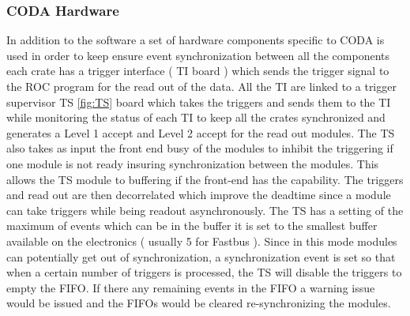 \documentclass{article}
\begin{document}
\subsubsection{CODA Hardware}
In addition to the software a set of hardware components specific to CODA is used in order to keep ensure event synchronization between all the components each crate has a trigger interface ( TI board )\cite{TIman} which sends the trigger signal to the ROC program for the read out of the data. All the TI are linked to a trigger supervisor TS\cite{TSman} \ref{fig:TS} board which takes the triggers and sends them to the TI while monitoring the status of each TI to keep all the crates synchronized and generates a Level 1 accept and Level 2 accept for the read out modules. The TS also takes as input the front end busy of the modules to inhibit the triggering if one module is not ready insuring synchronization between the modules.
This allows the TS module to buffering if the front-end has the capability. The triggers and read out are then decorrelated which improve the deadtime since a module can take triggers while being readout asynchronously. The TS has a setting of the maximum of events which can be in the buffer it is set to the smallest buffer available on the electronics ( usually 5 for Fastbus ). Since in this mode modules can potentially get out of synchronization, a synchronization event is set so that when a certain number of triggers is processed, the TS will disable the triggers to empty the FIFO. If there any remaining events in the FIFO a warning issue would be issued and the FIFOs would be cleared re-synchronizing the modules.
\end{document}
